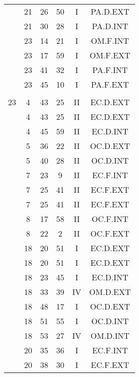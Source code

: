 \documentclass[12pt, a4paper]{article}
\begin{document}
\begin{multicols}{3}
{\begin{tabular}{c c c c c c}
	 	 	 	 & 21 & 26 & 50 & I & PA.D.EXT\\%
	 	 	 	 & 21 & 30 & 28 & I & PA.D.INT\\%
	 	 	 	 & 23 & 14 & 21 & I & OM.F.INT\\%
	 	 	 	 & 23 & 17 & 59 & I & OM.F.EXT\\%
	 	 	 	 & 23 & 41 & 32 & I & PA.F.INT\\%
	 	 	 	 & 23 & 45 & 10 & I & PA.F.EXT\\%
	 	 	 	 & & & & & \\%
	 	 	 	23 & 4 & 43 & 25 & II & EC.D.EXT\\%
	 	 	 	 & 4 & 43 & 25 & II & EC.D.EXT\\%
	 	 	 	 & 4 & 45 & 59 & II & EC.D.INT\\%
	 	 	 	 & 5 & 36 & 22 & II & OC.D.EXT\\%
	 	 	 	 & 5 & 40 & 28 & II & OC.D.INT\\%
	 	 	 	 & 7 & 23 & 9 & II & EC.F.INT\\%
	 	 	 	 & 7 & 25 & 41 & II & EC.F.EXT\\%
	 	 	 	 & 7 & 25 & 41 & II & EC.F.EXT\\%
	 	 	 	 & 8 & 17 & 58 & II & OC.F.INT\\%
	 	 	 	 & 8 & 22 & 2 & II & OC.F.EXT\\%
	 	 	 	 & 18 & 20 & 51 & I & EC.D.EXT\\%
	 	 	 	 & 18 & 20 & 51 & I & EC.D.EXT\\%
	 	 	 	 & 18 & 23 & 45 & I & EC.D.INT\\%
	 	 	 	 & 18 & 33 & 39 & IV & OM.D.EXT\\%
	 	 	 	 & 18 & 48 & 17 & I & OC.D.EXT\\%
	 	 	 	 & 18 & 51 & 55 & I & OC.D.INT\\%
	 	 	 	 & 18 & 53 & 27 & IV & OM.D.INT\\%
	 	 	 	 & 20 & 35 & 36 & I & EC.F.INT\\%
	 	 	 	 & 20 & 38 & 30 & I & EC.F.EXT\\%
	 	 \end{tabular}
 	}
\end{multicols}
\end{document}
